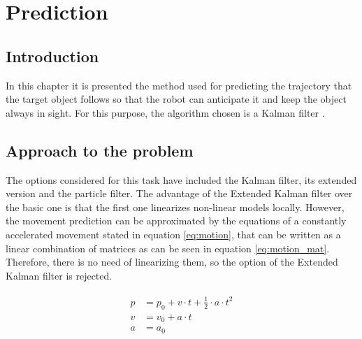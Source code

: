 
\chapter{Prediction} %
\label{chap:prediction}
\section{Introduction}
In this chapter it is presented the method used for predicting the trajectory that the target object follows so that the robot can anticipate it and keep the object always in sight.
For this purpose, the algorithm chosen is a Kalman filter \cite{kalman}.

\section{Approach to the problem}
The options considered for this task have included the Kalman filter, its extended version and the particle filter. The advantage of the Extended Kalman filter over the basic one is that the first one linearizes non-linear models locally. However, the movement prediction can be approximated by the equations of a constantly accelerated movement stated in equation \eqref{eq:motion}, that can be written as a linear combination of matrices as can be seen in equation \eqref{eq:motion_mat}. Therefore, there is no need of linearizing them, so the option of the Extended Kalman filter is rejected.

\begin{align}
\begin{split}
p &= p_{0} + v \cdot t + \frac{1}{2} \cdot a \cdot t^{2} \\
v &= v_{0} + a \cdot t \\
a &= a_{0} \\
\end{split}
\label{eq:motion}
\end{align}

